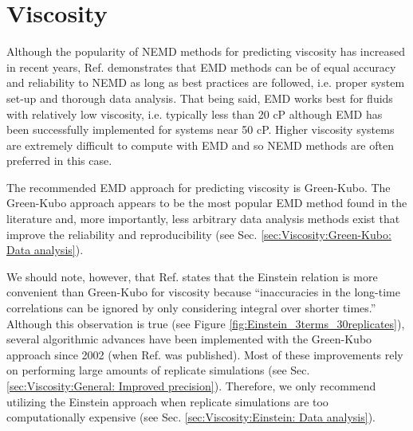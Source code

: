 \documentclass[9pt,bestpractices]{livecoms}
\begin{document}
\section{Viscosity} \label{sec:Viscosity}




Although the popularity of NEMD methods for predicting viscosity has increased in recent years, Ref. \cite{Chen2009} demonstrates that EMD methods can be of equal accuracy and reliability to NEMD as long as best practices are followed, i.e. proper system set-up and thorough data analysis. That being said, EMD works best for fluids with relatively low viscosity, i.e. typically less than 20 cP although EMD has been successfully implemented for systems near 50 cP. Higher viscosity systems are extremely difficult to compute with EMD and so NEMD methods are often preferred in this case.

The recommended EMD approach for predicting viscosity is Green-Kubo. The Green-Kubo approach appears to be the most popular EMD method found in the literature and, more importantly, less arbitrary data analysis methods exist that improve the reliability and reproducibility (see Sec. \ref{sec:Viscosity:Green-Kubo: Data analysis}). 

We should note, however, that Ref. \cite{Hess2002} states that the Einstein relation is more convenient than Green-Kubo for viscosity because ``inaccuracies in the long-time correlations can be ignored by only considering integral over shorter times.'' 
Although this observation is true (see Figure \ref{fig:Einstein_3terms_30replicates}), several algorithmic advances have been implemented with the Green-Kubo approach since 2002 (when Ref. \cite{Hess2002} was published). Most of these improvements rely on performing large amounts of replicate simulations (see Sec. \ref{sec:Viscosity:General: Improved precision}). Therefore, we only recommend utilizing the Einstein approach when replicate simulations are too computationally expensive (see Sec. \ref{sec:Viscosity:Einstein: Data analysis}).  
\end{document}
